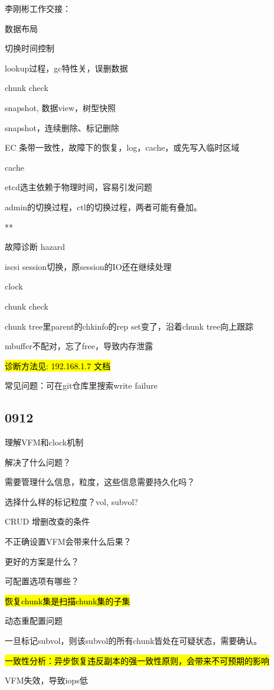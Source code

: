 李刚彬工作交接：
\begin{enumbox}
\item 数据布局
\item 切换时间控制
\item lookup过程，gc特性关，误删数据
\item chunk check
\item snapshot, 数据view，树型快照
\item snapshot，连续删除、标记删除
\item EC 条带一致性，故障下的恢复，log，cache，或先写入临时区域
\item cache
\item etcd选主依赖于物理时间，容易引发问题
\item admin的切换过程，ctl的切换过程，两者可能有叠加。
\item ***
\item 故障诊断 hazard
\item iscsi session切换，原session的IO还在继续处理
\item clock
\item chunk check
\item chunk tree里parent的chkinfo的rep set变了，沿着chunk tree向上跟踪
\item mbuffer不配对，忘了free，导致内存泄露
\item \hl{诊断方法见: 192.168.1.7 文档}
\item 常见问题：可在git仓库里搜索write failure
\end{enumbox}

\subsection{0912}

理解VFM和clock机制
\begin{enumbox}
\item 解决了什么问题？
\item 需要管理什么信息，粒度，这些信息需要持久化吗？
\item 选择什么样的标记粒度？vol, subvol?
\item CRUD 增删改查的条件
\item 不正确设置VFM会带来什么后果？
\item 更好的方案是什么？
\item 可配置选项有哪些？
\item \hl{恢复chunk集是扫描chunk集的子集}
\item 动态重配置问题
\item 一旦标记subvol，则该subvol的所有chunk皆处在可疑状态，需要确认。
\item \hl{一致性分析：异步恢复违反副本的强一致性原则，会带来不可预期的影响}
\item VFM失效，导致iops低
\end{enumbox}

